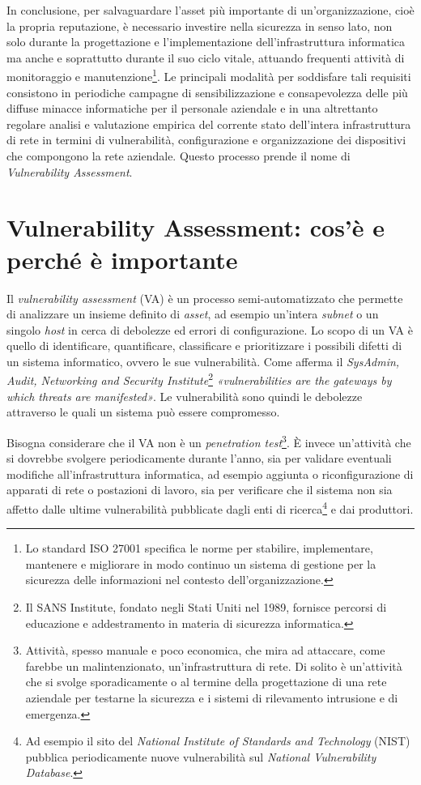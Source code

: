 \documentclass[target=bach,aauheader=]{thud}
\begin{document}
In conclusione, per salvaguardare l’asset più importante di un’organizzazione, cioè la propria reputazione, è necessario investire nella sicurezza in senso lato, non solo durante la progettazione e l’implementazione dell’infrastruttura informatica ma anche e soprattutto durante il suo ciclo vitale, attuando frequenti attività di monitoraggio e manutenzione\footnote{Lo standard ISO 27001 specifica le norme per stabilire, implementare, mantenere e migliorare in modo continuo un sistema di gestione per la sicurezza delle informazioni nel contesto dell’organizzazione.}. Le principali modalità per soddisfare tali requisiti consistono in periodiche campagne di sensibilizzazione e consapevolezza delle più diffuse minacce informatiche per il personale aziendale e in una altrettanto regolare analisi e valutazione empirica del corrente stato dell’intera infrastruttura di rete in termini di vulnerabilità, configurazione e organizzazione dei dispositivi che compongono la rete aziendale.
Questo processo prende il nome di \textit{Vulnerability Assessment}.


\chapter{Vulnerability Assessment: cos’è e perché è importante}

Il \textit{vulnerability assessment} (VA) è un processo semi-automatizzato che permette di analizzare un insieme definito di \textit{asset}, ad esempio un’intera \textit{subnet} o un singolo \textit{host} in cerca di debolezze ed errori di configurazione. Lo scopo di un VA è quello di identificare, quantificare, classificare e prioritizzare i possibili difetti di un sistema informatico, ovvero le sue vulnerabilità. Come afferma il \textit{SysAdmin, Audit, Networking and Security Institute}\footnote{Il SANS Institute, fondato negli Stati Uniti nel 1989, fornisce percorsi di educazione e addestramento in materia di sicurezza informatica.} \textit{«vulnerabilities are the gateways by which threats are manifested»}. Le vulnerabilità sono quindi le debolezze attraverso le quali un sistema può essere compromesso.

Bisogna considerare che il VA non è un \textit{penetration test}\footnote{Attività, spesso manuale e poco economica, che mira ad attaccare, come farebbe un malintenzionato, un’infrastruttura di rete. Di solito è un’attività che si svolge sporadicamente o al termine della progettazione di una rete aziendale per testarne la sicurezza e i sistemi di rilevamento intrusione e di emergenza.}. È invece un’attività che si dovrebbe svolgere periodicamente durante l’anno, sia per validare eventuali modifiche all’infrastruttura informatica, ad esempio aggiunta o riconfigurazione di apparati di rete o postazioni di lavoro, sia per verificare che il sistema non sia affetto dalle ultime vulnerabilità pubblicate dagli enti di ricerca\footnote{Ad esempio il sito del \textit{National Institute of Standards and Technology} (NIST) pubblica periodicamente nuove vulnerabilità sul \textit{National Vulnerability Database}.} e dai produttori.
\end{document}
